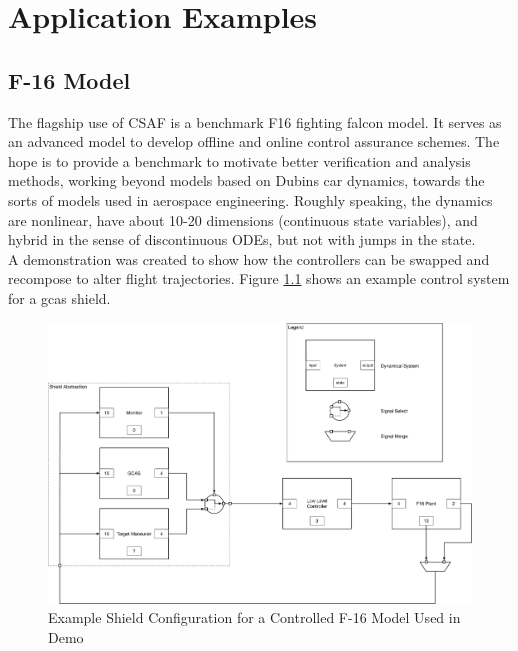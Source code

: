 \chapter{Application Examples}
\section{F-16 Model}

The flagship use of CSAF is a benchmark F16 fighting falcon model. It serves as an advanced model to develop offline and online control assurance schemes. The hope is to provide a benchmark to motivate better verification and analysis methods, working beyond models based on Dubins car dynamics, towards the sorts of models used in aerospace engineering. Roughly speaking, the dynamics are nonlinear, have about 10-20 dimensions (continuous state variables), and hybrid in the sense of discontinuous ODEs, but not with jumps in the state. \\

A demonstration was created to show how the controllers can be swapped and recompose to alter flight trajectories. Figure \ref{fig:f16demoblock} shows an example control system for a \acrlong{gcas} shield.

\begin{figure}[h]
\centering
\includegraphics[width=\linewidth]{./img/f16demoblock.pdf}
\caption{Example Shield Configuration for a Controlled F-16 Model Used in Demo}
\label{fig:f16demoblock}
\end{figure}



